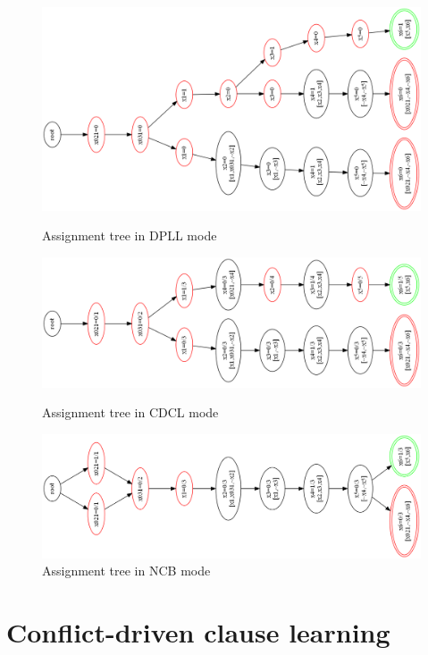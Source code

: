 \documentclass[11pt]{report}
\begin{document}
\begin{figure}
\begin{center}
\includegraphics[keepaspectratio=true,width=.9\textwidth]{tree1}
\caption{Assignment tree in DPLL mode}\label{fig.tree1}

\bigskip
\bigskip
\bigskip

\includegraphics[keepaspectratio=true,width=.9\textwidth]{tree2}
\caption{Assignment tree in CDCL mode}\label{fig.tree2}

\bigskip
\bigskip
\bigskip

\includegraphics[keepaspectratio=true,width=.9\textwidth]{tree3}
\end{center}
\caption{Assignment tree in NCB mode}\label{fig.tree3}
\end{figure}

\clearpage

\section{Conflict-driven clause learning}
\end{document}

